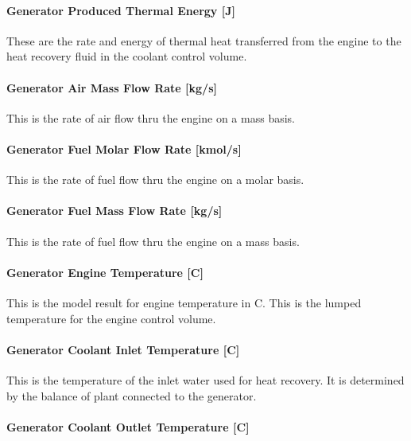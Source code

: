 \paragraph{Generator Produced Thermal Energy {[}J{]}}\label{generator-produced-thermal-energy-j-2}

These are the rate and energy of thermal heat transferred from the engine to the heat recovery fluid in the coolant control volume.

\paragraph{Generator Air Mass Flow Rate {[}kg/s{]}}\label{generator-air-mass-flow-rate-kgs}

This is the rate of air flow thru the engine on a mass basis.

\paragraph{Generator Fuel Molar Flow Rate {[}kmol/s{]}}\label{generator-fuel-molar-flow-rate-kmols}

This is the rate of fuel flow thru the engine on a molar basis.

\paragraph{Generator Fuel Mass Flow Rate {[}kg/s{]}}\label{generator-fuel-mass-flow-rate-kgs}

This is the rate of fuel flow thru the engine on a mass basis.

\paragraph{Generator Engine Temperature {[}C{]}}\label{generator-engine-temperature-c}

This is the model result for engine temperature in C. This is the lumped temperature for the engine control volume.

\paragraph{Generator Coolant Inlet Temperature {[}C{]}}\label{generator-coolant-inlet-temperature-c}

This is the temperature of the inlet water used for heat recovery. It is determined by the balance of plant connected to the generator.

\paragraph{Generator Coolant Outlet Temperature {[}C{]}}\label{generator-coolant-outlet-temperature-c}

